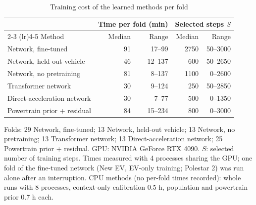 \begin{table}[t]
\centering
\footnotesize
\setlength{\tabcolsep}{4pt}
\caption{Training cost of the learned methods per fold}
\label{tab:compute}
\begin{tabular}{lrrrr}
\toprule
 & \multicolumn{2}{c}{Time per fold (min)} & \multicolumn{2}{c}{Selected steps $S$} \\
\cmidrule(lr){2-3} \cmidrule(lr){4-5}
Method & Median & Range & Median & Range \\
\midrule
Network, fine-tuned & 91 & 17--99 & 2750 & 50--3000 \\
Network, held-out vehicle & 46 & 12--137 & 600 & 50--2650 \\
Network, no pretraining & 81 & 8--137 & 1100 & 0--2600 \\
Transformer network & 30 & 9--124 & 250 & 50--2850 \\
Direct-acceleration network & 30 & 7--77 & 500 & 0--1350 \\
Powertrain prior + residual & 84 & 15--234 & 800 & 0--3000 \\
\bottomrule
\end{tabular}
\par\smallskip
\parbox{\linewidth}{\footnotesize Folds: 29 Network, fine-tuned; 13 Network, held-out vehicle; 13 Network, no pretraining; 13 Transformer network; 13 Direct-acceleration network; 25 Powertrain prior + residual. GPU: NVIDIA GeForce RTX 4090. $S$: selected number of training steps. Times measured with 4 processes sharing the GPU; one fold of the fine-tuned network (New EV, EV-only training; Polestar 2) was run alone after an interruption. CPU methods (no per-fold times recorded): whole runs with 8 processes, context-only calibration 0.5 h, population and powertrain prior 0.7 h each.}
\end{table}

